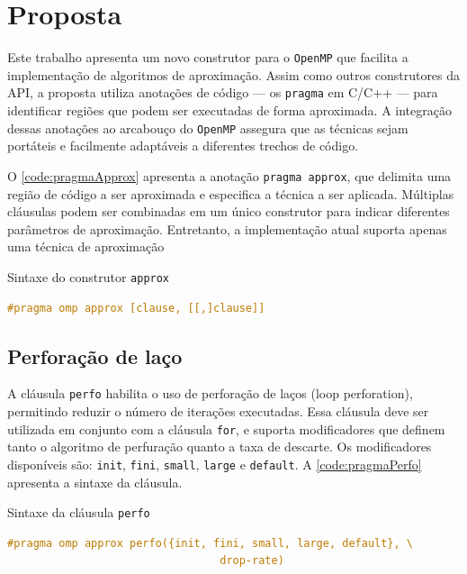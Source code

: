 \chapter{Proposta}\label{cap:proposta}

Este trabalho apresenta um novo construtor para o \texttt{OpenMP} que facilita a implementação de algoritmos de aproximação. Assim como outros construtores da API, a proposta utiliza anotações de código — os \texttt{pragma} em C/C++ — para identificar regiões que podem ser executadas de forma aproximada. A integração dessas anotações ao arcabouço do \texttt{OpenMP} assegura que as técnicas sejam portáteis e facilmente adaptáveis a diferentes trechos de código.

O \autoref{code:pragmaApprox} apresenta a anotação \texttt{pragma approx}, que delimita uma região de código a ser aproximada e especifica a técnica a ser aplicada. Múltiplas cláusulas podem ser combinadas em um único construtor para indicar diferentes parâmetros de aproximação. Entretanto, a implementação atual suporta apenas uma técnica de aproximação

\begin{sourcecode}[htb]\caption{\label{code:pragmaApprox}Sintaxe do construtor \texttt{approx}}
    \begin{lstlisting}[frame=single, language=C++]
        #pragma omp approx [clause, [[,]clause]]
    \end{lstlisting}
    \fonte{}
\end{sourcecode}

\section{Perforação de laço}\label{subsec:pragmaPerfo}

A cláusula \texttt{perfo} habilita o uso de perforação de laços (loop perforation), permitindo reduzir o número de iterações executadas. Essa cláusula deve ser utilizada em conjunto com a cláusula \texttt{for}, e suporta modificadores que definem tanto o algoritmo de perfuração quanto a taxa de descarte.
Os modificadores disponíveis são: \texttt{init}, \texttt{fini}, \texttt{small}, \texttt{large} e \texttt{default}.
A \autoref{code:pragmaPerfo} apresenta a sintaxe da cláusula.

\begin{sourcecode}[htb]
    \caption{\label{code:pragmaPerfo}Sintaxe da cláusula \texttt{perfo}}
    \begin{lstlisting}[frame=single, language=C++]
        #pragma omp approx perfo({init, fini, small, large, default}, \
                                 drop-rate)
    \end{lstlisting}
    \fonte{}
\end{sourcecode}

